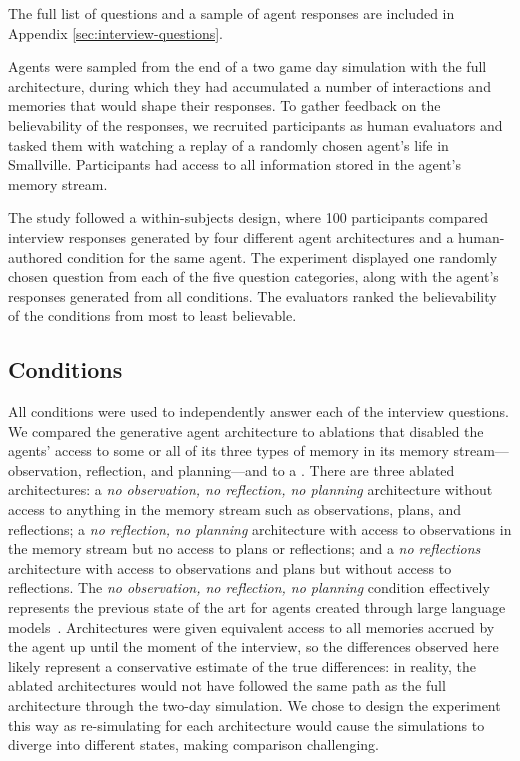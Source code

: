 The full list of questions and a sample of agent responses are included in Appendix \ref{sec:interview-questions}.

Agents were sampled from the end of a two game day simulation with the full architecture, during which they had accumulated a number of interactions and memories that would shape their responses. To gather feedback on the believability of the responses, we recruited participants as human evaluators and tasked them with watching a replay of a randomly chosen agent's life in Smallville. Participants had access to all information stored in the agent's memory stream.

The study followed a within-subjects design, where 100 participants compared interview responses generated by four different agent architectures and a human-authored condition for the same agent. The experiment displayed one randomly chosen question from each of the five question categories, along with the agent's responses generated from all conditions. The evaluators ranked the believability of the conditions from most to least believable.

\subsection{Conditions}
All conditions were used to independently answer each of the interview questions. We compared the generative agent architecture to ablations that disabled the agents' access to some or all of its three types of memory in its memory stream---observation, reflection, and planning---and to a {\color{black}{human crowdworker-authored condition}}. There are three ablated architectures: a \textit{no observation, no reflection, no planning} architecture without access to anything in the memory stream such as observations, plans, and reflections; a \textit{no reflection, no planning} architecture with access to observations in the memory stream but no access to plans or reflections; and a \textit{no reflections} architecture with access to observations and plans but without access to reflections. The \textit{no observation, no reflection, no planning} condition effectively represents the previous state of the art for agents created through large language models~\cite{9_park2022socialsimulacra,binz2023using,63_horton2023large}. Architectures were given equivalent access to all memories accrued by the agent up until the moment of the interview, so the differences observed here likely represent a conservative estimate of the true differences: in reality, the ablated architectures would not have followed the same path as the full architecture through the two-day simulation. We chose to design the experiment this way as re-simulating for each architecture would cause the simulations to diverge into different states, making comparison challenging.


